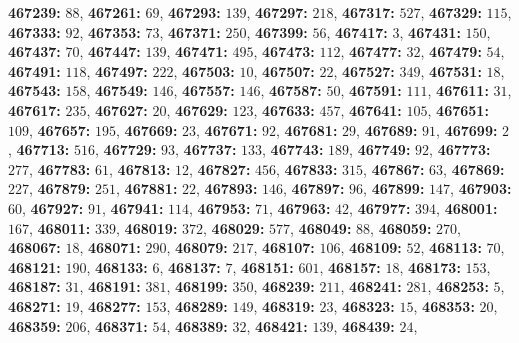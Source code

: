 \textsf{\bfseries 467239:} $88$, \textsf{\bfseries 467261:} $69$, \textsf{\bfseries 467293:} $139$, \textsf{\bfseries 467297:} $218$, \textsf{\bfseries 467317:} $527$, \textsf{\bfseries 467329:} $115$, \textsf{\bfseries 467333:} $92$, \textsf{\bfseries 467353:} $73$, \textsf{\bfseries 467371:} $250$, \textsf{\bfseries 467399:} $56$, \textsf{\bfseries 467417:} $3$, \textsf{\bfseries 467431:} $150$, \textsf{\bfseries 467437:} $70$, \textsf{\bfseries 467447:} $139$, \textsf{\bfseries 467471:} $495$, \textsf{\bfseries 467473:} $112$, \textsf{\bfseries 467477:} $32$, \textsf{\bfseries 467479:} $54$, \textsf{\bfseries 467491:} $118$, \textsf{\bfseries 467497:} $222$, \textsf{\bfseries 467503:} $10$, \textsf{\bfseries 467507:} $22$, \textsf{\bfseries 467527:} $349$, \textsf{\bfseries 467531:} $18$, \textsf{\bfseries 467543:} $158$, \textsf{\bfseries 467549:} $146$, \textsf{\bfseries 467557:} $146$, \textsf{\bfseries 467587:} $50$, \textsf{\bfseries 467591:} $111$, \textsf{\bfseries 467611:} $31$, \textsf{\bfseries 467617:} $235$, \textsf{\bfseries 467627:} $20$, \textsf{\bfseries 467629:} $123$, \textsf{\bfseries 467633:} $457$, \textsf{\bfseries 467641:} $105$, \textsf{\bfseries 467651:} $109$, \textsf{\bfseries 467657:} $195$, \textsf{\bfseries 467669:} $23$, \textsf{\bfseries 467671:} $92$, \textsf{\bfseries 467681:} $29$, \textsf{\bfseries 467689:} $91$, \textsf{\bfseries 467699:} $2$, \textsf{\bfseries 467713:} $516$, \textsf{\bfseries 467729:} $93$, \textsf{\bfseries 467737:} $133$, \textsf{\bfseries 467743:} $189$, \textsf{\bfseries 467749:} $92$, \textsf{\bfseries 467773:} $277$, \textsf{\bfseries 467783:} $61$, \textsf{\bfseries 467813:} $12$, \textsf{\bfseries 467827:} $456$, \textsf{\bfseries 467833:} $315$, \textsf{\bfseries 467867:} $63$, \textsf{\bfseries 467869:} $227$, \textsf{\bfseries 467879:} $251$, \textsf{\bfseries 467881:} $22$, \textsf{\bfseries 467893:} $146$, \textsf{\bfseries 467897:} $96$, \textsf{\bfseries 467899:} $147$, \textsf{\bfseries 467903:} $60$, \textsf{\bfseries 467927:} $91$, \textsf{\bfseries 467941:} $114$, \textsf{\bfseries 467953:} $71$, \textsf{\bfseries 467963:} $42$, \textsf{\bfseries 467977:} $394$, \textsf{\bfseries 468001:} $167$, \textsf{\bfseries 468011:} $339$, \textsf{\bfseries 468019:} $372$, \textsf{\bfseries 468029:} $577$, \textsf{\bfseries 468049:} $88$, \textsf{\bfseries 468059:} $270$, \textsf{\bfseries 468067:} $18$, \textsf{\bfseries 468071:} $290$, \textsf{\bfseries 468079:} $217$, \textsf{\bfseries 468107:} $106$, \textsf{\bfseries 468109:} $52$, \textsf{\bfseries 468113:} $70$, \textsf{\bfseries 468121:} $190$, \textsf{\bfseries 468133:} $6$, \textsf{\bfseries 468137:} $7$, \textsf{\bfseries 468151:} $601$, \textsf{\bfseries 468157:} $18$, \textsf{\bfseries 468173:} $153$, \textsf{\bfseries 468187:} $31$, \textsf{\bfseries 468191:} $381$, \textsf{\bfseries 468199:} $350$, \textsf{\bfseries 468239:} $211$, \textsf{\bfseries 468241:} $281$, \textsf{\bfseries 468253:} $5$, \textsf{\bfseries 468271:} $19$, \textsf{\bfseries 468277:} $153$, \textsf{\bfseries 468289:} $149$, \textsf{\bfseries 468319:} $23$, \textsf{\bfseries 468323:} $15$, \textsf{\bfseries 468353:} $20$, \textsf{\bfseries 468359:} $206$, \textsf{\bfseries 468371:} $54$, \textsf{\bfseries 468389:} $32$, \textsf{\bfseries 468421:} $139$, \textsf{\bfseries 468439:} $24$, 
